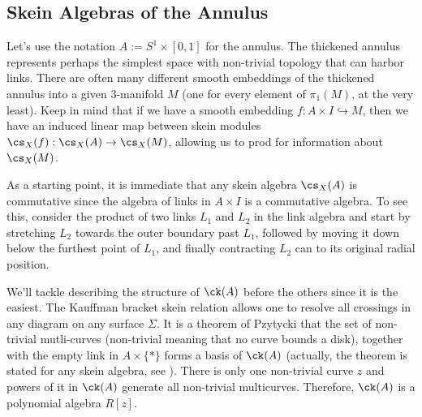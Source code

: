 
\begin{center}
\end{center}

\subsection{Skein Algebras of the Annulus}

Let's use the notation $A := S^1 \times [0,1]$ for the annulus. The thickened annulus represents perhaps the simplest space with non-trivial topology that can harbor links. There are often many different smooth embeddings of the thickened annulus into a given 3-manifold $M$ (one for every element of $\pi_1(M)$, at the very least). Keep in mind that if we have a smooth embedding $f: A \times I \hookrightarrow M$, then we have an induced linear map between skein modules $\cs_X(f): \cs_X (A) \to \cs_X (M)$, allowing us to prod for information about $\cs_X(M)$. 

As a starting point, it is immediate that any skein algebra $\cs_X(A)$ is commutative since the algebra of links in $A \times I$ is a commutative algebra. To see this, consider the product of two links $L_1$ and $L_2$ in the link algebra and start by stretching $L_2$ towards the outer boundary past $L_1$, followed by moving it down below the furthest point of $L_1$, and finally contracting $L_2$ can to its original radial position. 

We'll tackle describing the structure of $\ck(A)$ before the others since it is the easiest. The Kauffman bracket skein relation allows one to resolve all crossings in any diagram on any surface $\Sigma$. It is a theorem of Pzytycki that the set of non-trivial mutli-curves (non-trivial meaning that no curve bounds a disk), together with the empty link in $A \times \{ \ast \}$ forms a basis of $\ck(A)$ (actually, the theorem is stated for any skein algebra, see ). There is only one non-trivial curve $z$ and powers of it in $\ck(A)$ generate all non-trivial multicurves. Therefore, $\ck(A)$ is a polynomial algebra $R[z]$. 

